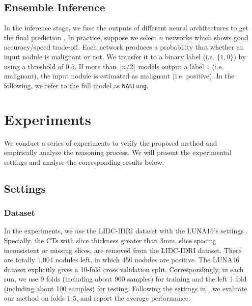 \documentclass[final,5p,times,twocolumn]{elsarticle}
\begin{document}
\subsection{Ensemble Inference}
\label{ssec:inference}

In the inference stage, we fuse the outputs of different neural architectures to get the final prediction  \citep{DeepForest}. In practice, suppose we select $n$ networks which shows good accuracy/speed trade-off. Each network produces a probability that whether an input nodule is malignant or not. We transfer it to a binary label (i.e. $\{1, 0\}$) by using a threshold of $0.5$. If more than $\lfloor n/2 \rfloor$ models output a label $1$ (i.e. malignant), the input nodule is estimated as malignant (i.e. positive). In the following, we refer to the full model as \texttt{NASLung}. 






\section{Experiments}
\label{sec:exp}

We conduct a series of experiments to verify the proposed method and empirically analyse the reasoning process. We will present the experimental settings and analyse the corresponding results below. 

\subsection{Settings}
\label{ssec:exp_settings}

\subsubsection{Dataset} 
\label{ssec:exp_data}
In the experiments, we use the LIDC-IDRI dataset \citep{armato2015LIDCdata, armato2011LIDCpub} with the LUNA16's settings \citep{kuan2017deep}. Specially, the CTs with slice thickness greater than 3mm, slice spacing inconsistent or missing slices, are removed from the LIDC-IDRI dataset. There are totally 1,004 nodules left, in which 450 nodules are positive. The LUNA16 dataset explicitly gives a 10-fold cross validation split. Correspondingly, in each run, we use 9 folds (including about 900 samples) for training and the left 1 fold (including about 100 samples) for testing. Following the settings in \citep{zhu2018deeplung}, we evaluate our method on folds 1-5, and report the average performance. 
\end{document}
